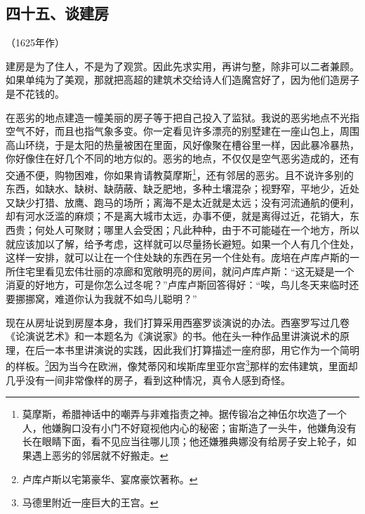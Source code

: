 \subsection*{四十五、谈建房}
\begin{center}
    （1625年作）
\end{center}
\par 建房是为了住人，不是为了观赏。因此先求实用，再讲匀整，除非可以二者兼顾。如果单纯为了美观，那就把高超的建筑术交给诗人们造魔宫好了，因为他们造房子是不花钱的。
\par 在恶劣的地点建造一幢美丽的房子等于把自己投入了监狱。我说的恶劣地点不光指空气不好，而且也指气象多变。你一定看见许多漂亮的别墅建在一座山包上，周围高山环绕，于是太阳的热量被困在里面，风好像聚在槽谷里一样，因此暴冷暴热，你好像住在好几个不同的地方似的。恶劣的地点，不仅仅是空气恶劣造成的，还有交通不便，购物困难，你如果肯请教莫摩斯\footnote{莫摩斯，希腊神话中的嘲弄与非难指责之神。据传锻冶之神伍尔坎造了一个人，他嫌胸口没有小门不好窥视他内心的秘密；宙斯造了一头牛，他嫌角没有长在眼睛下面，看不见应当往哪儿顶；他还嫌雅典娜没有给房子安上轮子，如果遇上恶劣的邻居就不好搬走。}，还有邻居的恶劣。且不说许多别的东西，如缺水、缺树、缺荫蔽、缺乏肥地，多种土壤混杂；视野窄，平地少，近处又缺少打猎、放鹰、跑马的场所；离海不是太近就是太远；没有河流通航的便利，却有河水泛滥的麻烦；不是离大城市太远，办事不便，就是离得过近，花销大，东西贵；何处人可聚财；哪里人会受困；凡此种种，由于不可能碰在一个地方，所以就应该加以了解，给予考虑，这样就可以尽量扬长避短。如果一个人有几个住处，这样一安排，就可以让在一个住处缺的东西在另一个住处有。庞培在卢库卢斯的一所住宅里看见宏伟壮丽的凉廊和宽敞明亮的房间，就问卢库卢斯：“这无疑是一个消夏的好地方，可是你怎么过冬呢？”卢库卢斯回答得好：“唉，鸟儿冬天来临时还要挪挪窝，难道你认为我就不如鸟儿聪明？”
\par 现在从房址说到房屋本身，我们打算采用西塞罗谈演说的办法。西塞罗写过几卷《论演说艺术》和一本题名为《演说家》的书。他在头一种作品里讲演说术的原理，在后一本书里讲演说的实践，因此我们打算描述一座府邸，用它作为一个简明的样板。\footnote{卢库卢斯以宅第豪华、宴席豪饮著称。}因为当今在欧洲，像梵蒂冈和埃斯库里亚尔宫\footnote{马德里附近一座巨大的王宫。}那样的宏伟建筑，里面却几乎没有一间非常像样的房子，看到这种情况，真令人感到奇怪。
